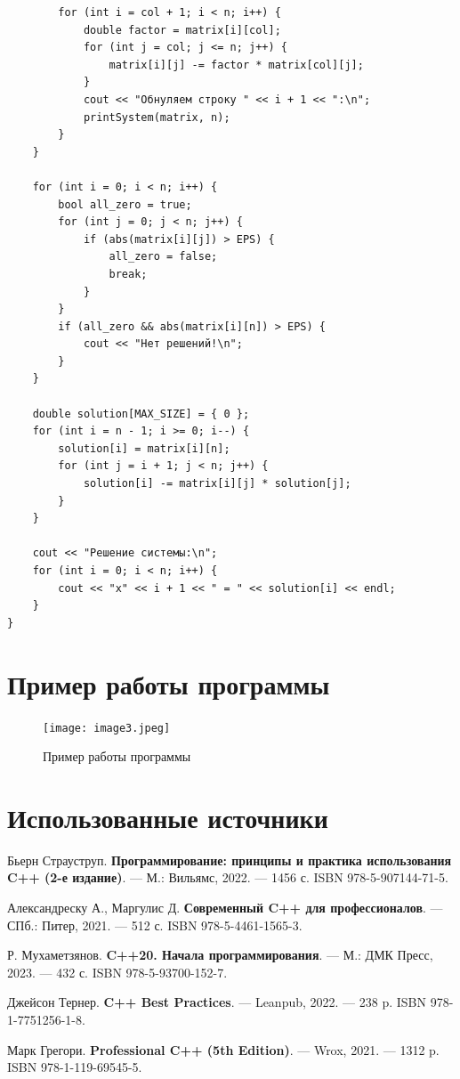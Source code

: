 \documentclass[a4paper,12pt]{article}
\begin{document}
\begin{verbatim}
        for (int i = col + 1; i < n; i++) {
            double factor = matrix[i][col];
            for (int j = col; j <= n; j++) {
                matrix[i][j] -= factor * matrix[col][j];
            }
            cout << "Обнуляем строку " << i + 1 << ":\n";
            printSystem(matrix, n);
        }
    }
    
    for (int i = 0; i < n; i++) {
        bool all_zero = true;
        for (int j = 0; j < n; j++) {
            if (abs(matrix[i][j]) > EPS) {
                all_zero = false;
                break;
            }
        }
        if (all_zero && abs(matrix[i][n]) > EPS) {
            cout << "Нет решений!\n";
        }
    }
    
    double solution[MAX_SIZE] = { 0 };
    for (int i = n - 1; i >= 0; i--) {
        solution[i] = matrix[i][n];
        for (int j = i + 1; j < n; j++) {
            solution[i] -= matrix[i][j] * solution[j];
        }
    }
    
    cout << "Решение системы:\n";
    for (int i = 0; i < n; i++) {
        cout << "x" << i + 1 << " = " << solution[i] << endl;
    }
}
\end{verbatim}

\section{Пример работы программы}
\begin{figure}[H]
\centering
\texttt{[image: image3.jpeg]}
\caption{Пример работы программы}
\end{figure}

\newpage

\section*{Использованные источники}

\begin{thebibliography}{9}
Бьерн Страуструп. \textbf{Программирование: принципы и практика использования C++ (2-е издание)}. — М.: Вильямс, 2022. — 1456 с. ISBN 978-5-907144-71-5.

Александреску А., Маргулис Д. \textbf{Современный C++ для профессионалов}. — СПб.: Питер, 2021. — 512 с. ISBN 978-5-4461-1565-3.

Р. Мухаметзянов. \textbf{C++20. Начала программирования}. — М.: ДМК Пресс, 2023. — 432 с. ISBN 978-5-93700-152-7.

Джейсон Тернер. \textbf{C++ Best Practices}. — Leanpub, 2022. — 238 p. ISBN 978-1-7751256-1-8.

Марк Грегори. \textbf{Professional C++ (5th Edition)}. — Wrox, 2021. — 1312 p. ISBN 978-1-119-69545-5.
\end{thebibliography}
\end{document}
